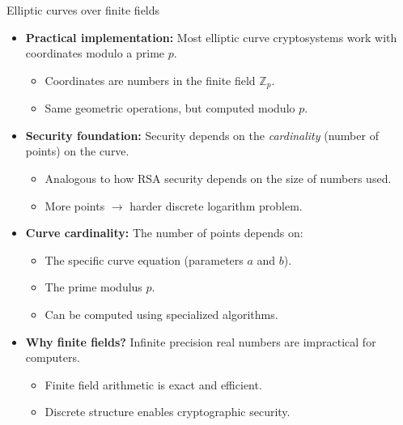 \documentclass[aspectratio=169, lualatex, handout]{beamer}
\begin{document}
\begin{frame}{Elliptic curves over finite fields}
	\begin{itemize}[<+->]
		\item \textbf{Practical implementation:} Most elliptic curve cryptosystems work with coordinates modulo a prime $p$.
		      \begin{itemize}
			      \item Coordinates are numbers in the finite field $\mathbb{Z}_p$.
			      \item Same geometric operations, but computed modulo $p$.
		      \end{itemize}
		\item \textbf{Security foundation:} Security depends on the \emph{cardinality} (number of points) on the curve.
		      \begin{itemize}
			      \item Analogous to how RSA security depends on the size of numbers used.
			      \item More points $\rightarrow$ harder discrete logarithm problem.
		      \end{itemize}
		\item \textbf{Curve cardinality:} The number of points depends on:
		      \begin{itemize}
			      \item The specific curve equation (parameters $a$ and $b$).
			      \item The prime modulus $p$.
			      \item Can be computed using specialized algorithms.
		      \end{itemize}
		\item \textbf{Why finite fields?} Infinite precision real numbers are impractical for computers.
		      \begin{itemize}
			      \item Finite field arithmetic is exact and efficient.
			      \item Discrete structure enables cryptographic security.
		      \end{itemize}
	\end{itemize}
\end{frame}
\end{document}

